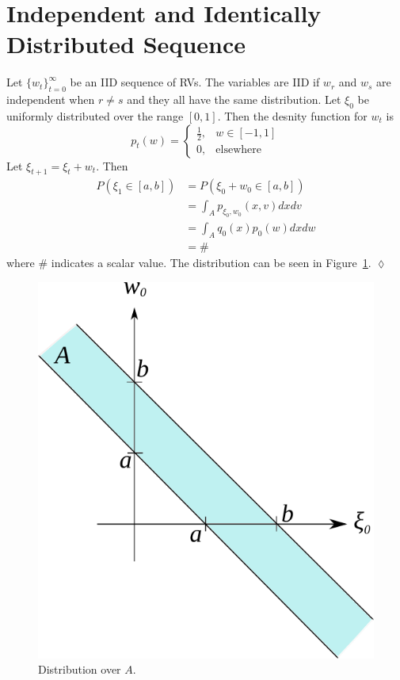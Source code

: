 \section{Independent and Identically Distributed Sequence}
\begin{example}
Let $\lbrace w_t\rbrace_{t=0}^\infty$ be an IID sequence of RVs.
The variables are IID if $w_r$ and $w_s$ are independent when $r\neq s$ and they all have the same distribution.
Let $\xi_0$ be uniformly distributed over the range $[0,1]$.
Then the desnity function for $w_t$ is
$$p_t(w) = \begin{cases} \frac{1}{2}, & w\in[-1,1] \\ 0, & \text{elsewhere} \end{cases}$$
Let $\xi_{t+1}=\xi_t+w_t$.
Then
\begin{align*}
P(\xi_1\in[a,b]) &= P(\xi_0 + w_0\in[a,b]) \\
&= \int_A p_{\xi_0,w_0}(x,v)dxdv \\
&= \int_A q_0(x)p_0(w)dxdw \\
&= \#
\end{align*}
where $\#$ indicates a scalar value.
The distribution can be seen in Figure~\ref{fig:02iid}.
$\lozenge$
\end{example}

\begin{figure}[ht!]
\centering
\includegraphics[width=.3\textwidth]{images/02iid}
\caption{Distribution over $A$.}
\label{fig:02iid}
\end{figure}%
